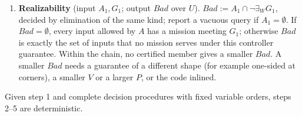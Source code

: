 \documentclass[10pt,a4paper]{article}
\newcommand{\ex}{\exists}
\newcommand{\Bad}{\mathit{Bad}}
\begin{document}
\begin{enumerate}
For a convex polygonal fence $\{z:n_i\cdot z\le b_i\}$ and a tube in a norm $\lVert\cdot\rVert$ with dual norm $\lVert\cdot\rVert_*$ no solver is needed, because the largest value of $n\cdot z$ over the $\rho$-neighbourhood of a segment $[a,b]$ is $\max(n\cdot a,n\cdot b)+\rho\lVert n\rVert_*$, so the fence part of $G_1$ asks every waypoint to lie in the fence with facet $i$ moved inward by $\rho\lVert n_i\rVert_*$, and the set of admissible starts adds its own support value. The elimination splits per leg, since each fence and tube condition involves the two endpoints of one leg only, so a mechanised call sees the coordinates of one leg and $U$ instead of all $5+2N$ free variables.
\item \textbf{Realizability} (input $A_1,G_1$; output $\Bad$ over $U$). $\Bad:=A_1\cap\lnot\ex_W G_1$, decided by elimination of the same kind; report a vacuous query if $A_1=\emptyset$. If $\Bad=\emptyset$, every input allowed by $A$ has a mission meeting $G_1$; otherwise $\Bad$ is exactly the set of inputs that no mission serves under this controller guarantee. Within the chain, no certified member gives a smaller $\Bad$. A smaller $\Bad$ needs a guarantee of a different shape (for example one-sided at corners), a smaller $V$ or a larger $P$, or the code inlined.
\end{enumerate}
Given step 1 and complete decision procedures with fixed variable orders, steps 2--5 are deterministic.
\end{document}
